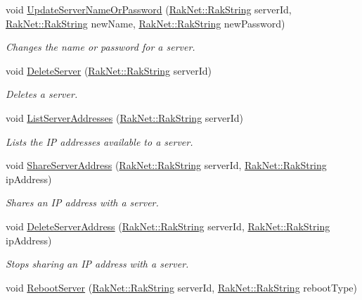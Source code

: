 \begin{DoxyCompactItemize}
void \hyperlink{class_rak_net_1_1_rackspace_aee8be6944eeb73bcadee60bb52726604}{Update\-Server\-Name\-Or\-Password} (\hyperlink{class_rak_net_1_1_rak_string}{Rak\-Net\-::\-Rak\-String} server\-Id, \hyperlink{class_rak_net_1_1_rak_string}{Rak\-Net\-::\-Rak\-String} new\-Name, \hyperlink{class_rak_net_1_1_rak_string}{Rak\-Net\-::\-Rak\-String} new\-Password)
\begin{DoxyCompactList}\small\item\em Changes the name or password for a server. \end{DoxyCompactList}\item 
void \hyperlink{class_rak_net_1_1_rackspace_a9aaadd52478d59561ab01ca1f3604693}{Delete\-Server} (\hyperlink{class_rak_net_1_1_rak_string}{Rak\-Net\-::\-Rak\-String} server\-Id)
\begin{DoxyCompactList}\small\item\em Deletes a server. \end{DoxyCompactList}\item 
void \hyperlink{class_rak_net_1_1_rackspace_a2a528ddfbf131fa09d43cc31476906cf}{List\-Server\-Addresses} (\hyperlink{class_rak_net_1_1_rak_string}{Rak\-Net\-::\-Rak\-String} server\-Id)
\begin{DoxyCompactList}\small\item\em Lists the I\-P addresses available to a server. \end{DoxyCompactList}\item 
void \hyperlink{class_rak_net_1_1_rackspace_ab062acbfde2d8fe5c0089060e29b6d11}{Share\-Server\-Address} (\hyperlink{class_rak_net_1_1_rak_string}{Rak\-Net\-::\-Rak\-String} server\-Id, \hyperlink{class_rak_net_1_1_rak_string}{Rak\-Net\-::\-Rak\-String} ip\-Address)
\begin{DoxyCompactList}\small\item\em Shares an I\-P address with a server. \end{DoxyCompactList}\item 
void \hyperlink{class_rak_net_1_1_rackspace_ad00e9ea6b35ef5d1cba747d74a575956}{Delete\-Server\-Address} (\hyperlink{class_rak_net_1_1_rak_string}{Rak\-Net\-::\-Rak\-String} server\-Id, \hyperlink{class_rak_net_1_1_rak_string}{Rak\-Net\-::\-Rak\-String} ip\-Address)
\begin{DoxyCompactList}\small\item\em Stops sharing an I\-P address with a server. \end{DoxyCompactList}\item 
void \hyperlink{class_rak_net_1_1_rackspace_a5b14f302a39a912a4c22723d83526d44}{Reboot\-Server} (\hyperlink{class_rak_net_1_1_rak_string}{Rak\-Net\-::\-Rak\-String} server\-Id, \hyperlink{class_rak_net_1_1_rak_string}{Rak\-Net\-::\-Rak\-String} reboot\-Type)

\end{DoxyCompactItemize}
